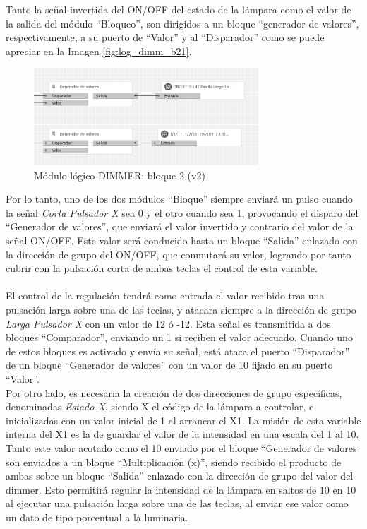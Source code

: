 Tanto la señal invertida del ON/OFF del estado de la lámpara como el valor de la salida del módulo “Bloqueo”, son dirigidos a un bloque “generador de valores”, respectivamente, a su puerto de “Valor” y al “Disparador” como se puede apreciar en la Imagen \ref{fig:log_dimm_b21}. 

\begin{figure}[H]
\centering
\includegraphics[width=0.75\textwidth]{figures/log_dimm_b22.png}  
\caption{Módulo lógico DIMMER: bloque 2 (v2)}
\label{fig:log_dimm_b22}
\end{figure}

Por lo tanto, uno de los dos módulos “Bloque” siempre enviará un pulso cuando la señal \textit{Corta Pulsador X} sea 0 y el otro cuando sea 1, provocando el disparo del “Generador de valores”, que enviará el valor invertido y contrario del valor de la señal ON/OFF. Este valor será conducido hasta un bloque “Salida” enlazado con la dirección de grupo del ON/OFF, que conmutará su valor, logrando por tanto cubrir con la pulsación corta de ambas teclas el control de esta variable.\\\\

El control de la regulación tendrá como entrada el valor recibido tras una pulsación larga sobre una de las teclas, y atacara siempre a la dirección de grupo \textit{Larga Pulsador X} con un valor de 12 ó -12. Esta señal es transmitida a dos bloques “Comparador”, enviando un 1 si reciben el valor adecuado. Cuando uno de estos bloques es activado y envía su señal, está ataca el puerto “Disparador” de un bloque “Generador de valores” con un valor de 10 fijado en su puerto “Valor”. \\
Por otro lado, es necesaria la creación de dos direcciones de grupo específicas, denominadas \textit{Estado X}, siendo X el código de la lámpara a controlar, e inicializadas con un valor inicial de 1 al arrancar el X1. La misión de esta variable interna del X1 es la de guardar el valor de la intensidad en una escala del 1 al 10. Tanto este valor acotado como el 10 enviado por el bloque “Generador de valores son enviados a un bloque “Multiplicación (x)”, siendo recibido el producto de ambas sobre un bloque “Salida” enlazado con la dirección de grupo del valor del dimmer. Esto permitirá regular la intensidad de la lámpara en saltos de 10 en 10 al ejecutar una pulsación larga sobre una de las teclas, al enviar ese valor como un dato de tipo porcentual a la luminaria.

